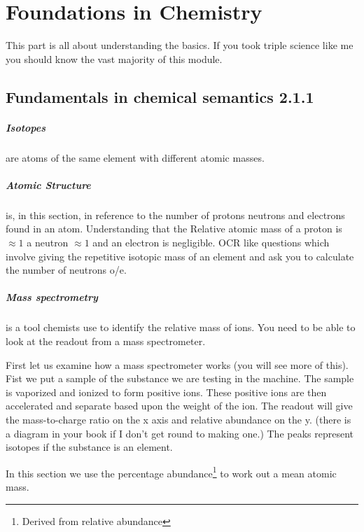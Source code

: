 \chapter{Foundations in Chemistry}
	This part is all about understanding the basics. If you took triple science like me you should know the vast majority of this module.
	
\section{Fundamentals in chemical semantics 2.1.1}
	
	\paragraph{Isotopes} are atoms of the same element with different atomic masses.
	
	\paragraph{Atomic Structure} is, in this section, in reference to the number of protons neutrons and electrons found in an atom.
	Understanding that the Relative atomic mass of a proton is $\approx 1$ a neutron $\approx 1$ and an electron is negligible.
	OCR like questions which involve giving the repetitive isotopic mass of an element and ask you to calculate the number of neutrons o/e.
	
	\paragraph{Mass spectrometry} is a tool chemists use to identify the relative mass of ions.
	You need to be able to look at the readout from a mass spectrometer.
	
	First let us examine how a mass spectrometer works (you will see more of this).
	Fist we put a sample of the substance we are testing in the machine.
	The sample is vaporized and ionized to form positive ions.
	These positive ions are then accelerated and separate based upon the weight of the ion.
	The readout will give the mass-to-charge ratio on the x axis and relative abundance on the y.
	(there is a diagram in your book if I don't get round to making one.) The peaks represent isotopes if the substance is an element.
	
	In this section we use the percentage abundance\footnote{Derived from relative abundance} to work out a mean atomic mass.
	
